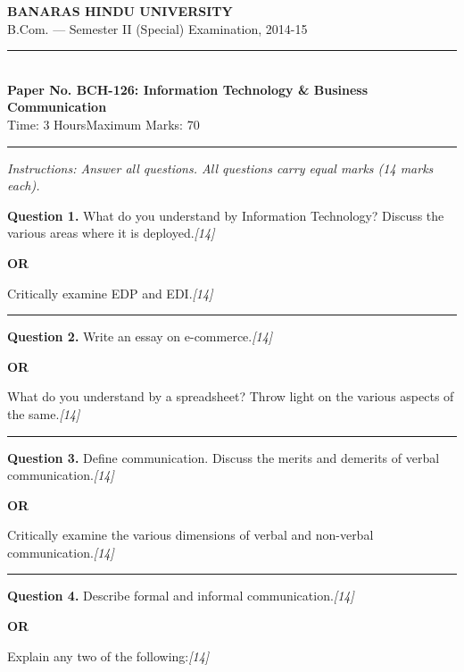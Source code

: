 \documentclass[11pt,a4paper]{article}
\newcommand{\pts}[1]{\hfill   \textit{[#1]}}
\begin{document}
\begin{center}
  {\large\bfseries BANARAS HINDU UNIVERSITY}\\[2pt]
  {\normalsize B.Com. --- Semester II (Special) Examination, 2014-15}\\[6pt]
  \rule{0.8\linewidth}{0.5pt}\\[6pt]
  {\large\bfseries Paper No. BCH-126: Information Technology \& Business Communication}\\[4pt]
  {\normalsize Time: 3 Hours\hfill Maximum Marks: 70}
\end{center}

\rule{\linewidth}{0.4pt}

\smallskip



\noindent   \textit{Instructions: Answer all questions. All questions carry equal marks (14 marks each).}

\bigskip




\noindent   \textbf{Question 1.}
What do you understand by Information Technology? Discuss the various areas where it is deployed.\pts{14}

\centerline{   \textbf{OR}}

Critically examine EDP and EDI.\pts{14}

\medskip\rule{\linewidth}{0.2pt}




\noindent   \textbf{Question 2.}
Write an essay on e-commerce.\pts{14}

\centerline{   \textbf{OR}}

What do you understand by a spreadsheet? Throw light on the various aspects of the same.\pts{14}

\medskip\rule{\linewidth}{0.2pt}




\noindent   \textbf{Question 3.}
Define communication. Discuss the merits and demerits of verbal communication.\pts{14}

\centerline{   \textbf{OR}}

Critically examine the various dimensions of verbal and non-verbal communication.\pts{14}

\medskip\rule{\linewidth}{0.2pt}




\noindent   \textbf{Question 4.}
Describe formal and informal communication.\pts{14}

\centerline{   \textbf{OR}}

Explain any two of the following:\pts{14}
\end{document}
